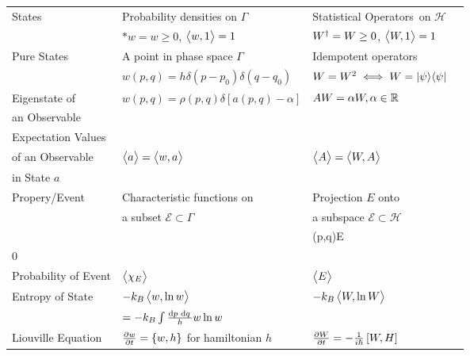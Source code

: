 \begin{table}[!htbp]
\begin{center}
\begin{tabular}{l||l|ll}
		\hline 
		States & Probability densities on \(\Gamma\) & Statistical Operators\footnotemark\ on \(\mathscr H\)\\
		       & \(\ast w = w \geq 0\), \(\left\langle \begin{matrix}w,1\end{matrix} \right\rangle=1\) & \(W^{\dagger} = W \geq 0\), \(\left\langle \begin{matrix}W,1\end{matrix} \right\rangle=1\)\begin{minipage}[c][10mm][t]{0.1mm}\end{minipage}\\
		\hline
		Pure States\footnotemark\ & A point in phase space \(\Gamma\) & Idempotent operators\\
			    &\(w(p,q) = h\delta(p-p_0)\delta(q-q_0)\) & \(W=W^2 \iff W = \lvert\psi\rangle\langle\psi\rvert\)\begin{minipage}[c][10mm][t]{0.1mm}\end{minipage}\\
		\hline
		Eigenstate of &\(w(p,q) = \rho(p,q)\delta[a(p,q)-\alpha]\)&\(AW = \alpha W,\alpha\in\mathbb{R}\)&\begin{minipage}[c][10mm][t]{0.1mm}\end{minipage}\\
		an Observable &&\\
		\hline
		Expectation Values & & \\
		of an Observable & \(\left\langle \begin{matrix}a\end{matrix} \right\rangle = \left\langle \begin{matrix}w,a\end{matrix} \right\rangle\)& \(\left\langle \begin{matrix}A\end{matrix} \right\rangle = \left\langle \begin{matrix}W,A\end{matrix} \right\rangle\)\\
		in State \(a\) & & \\
		\hline
		Propery/Event & Characteristic functions on  & Projection \(E\) onto \\
			      & a subset \(\mathcal E \subset \Gamma\) & a subspace \(\mathcal E \subset \mathscr H\)\\
			      & \(\chi_{\mathcal E} (p,q) = \begin{cases}
				      1 & (p,q)\in \mathcal E\\
				      0 & \text{otherwise}
			      \end{cases}\)&
				      \begin{minipage}[c][10mm][t]{0.1mm}\end{minipage}\\	
		\hline
		Probability of Event & \(\left\langle \begin{matrix}\chi_E\end{matrix} \right\rangle\) & \(\left\langle \begin{matrix}E\end{matrix} \right\rangle\)\begin{minipage}[c][10mm][t]{0.1mm}\end{minipage}\\	
		\hline 
		Entropy of State\footnotemark\ & \(-k_B\left\langle \begin{matrix}w,\ln w\end{matrix} \right\rangle\)& \(-k_B\left\langle \begin{matrix}W,\ln W\end{matrix} \right\rangle\)\\
					      & \(= -k_B\int\frac{\d{p}\d{q}}{h}w\ln w\) &  \begin{minipage}[c][10mm][t]{0.1mm}\end{minipage}\\	
		\hline
		Liouville Equation\footnotemark\ & \(\frac{\partial w}{\partial t} = \{w,h\}\) for hamiltonian \(h\)&  \(\frac{\partial W}{\partial t} = -\frac{1}{i\hbar}\left[W,H\right]\)\begin{minipage}[c][10mm][t]{0.1mm}\end{minipage}\\	
	\end{tabular}
\end{center}
\end{table}
